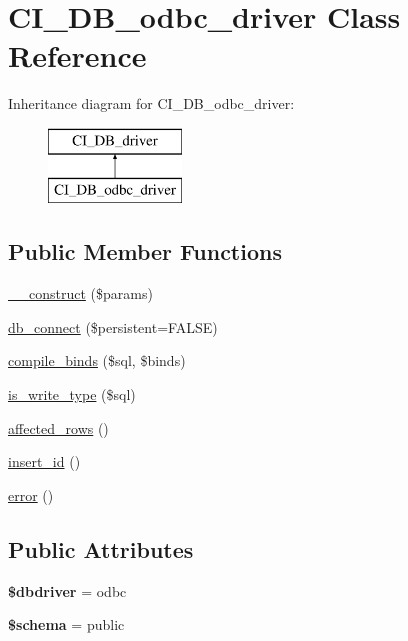 \hypertarget{class_c_i___d_b__odbc__driver}{}\section{C\+I\+\_\+\+D\+B\+\_\+odbc\+\_\+driver Class Reference}
\label{class_c_i___d_b__odbc__driver}
Inheritance diagram for C\+I\+\_\+\+D\+B\+\_\+odbc\+\_\+driver\+:\begin{figure}[H]
\begin{center}
\leavevmode
\includegraphics[height=2.000000cm]{class_c_i___d_b__odbc__driver}
\end{center}
\end{figure}
\subsection*{Public Member Functions}
\begin{DoxyCompactItemize}
\item 
\mbox{\hyperlink{class_c_i___d_b__odbc__driver_a1a5710dfc68a455b9e5c39980e8c5daa}{\+\_\+\+\_\+construct}} (\$params)
\item 
\mbox{\hyperlink{class_c_i___d_b__odbc__driver_aa14bb594952a5e7869ee61633dc27e69}{db\+\_\+connect}} (\$persistent=F\+A\+L\+SE)
\item 
\mbox{\hyperlink{class_c_i___d_b__odbc__driver_ab835fef7e59fe57a52ce68670421d7aa}{compile\+\_\+binds}} (\$sql, \$binds)
\item 
\mbox{\hyperlink{class_c_i___d_b__odbc__driver_a34015edad08eb1922dec8269f4bf87f1}{is\+\_\+write\+\_\+type}} (\$sql)
\item 
\mbox{\hyperlink{class_c_i___d_b__odbc__driver_a7b25b423b57b22ce7715e805e36aa334}{affected\+\_\+rows}} ()
\item 
\mbox{\hyperlink{class_c_i___d_b__odbc__driver_aff1a96e2d3908fc691f202d52fa7e324}{insert\+\_\+id}} ()
\item 
\mbox{\hyperlink{class_c_i___d_b__odbc__driver_a80b31b6166f5a41763f30c377453a656}{error}} ()
\end{DoxyCompactItemize}
\subsection*{Public Attributes}
\begin{DoxyCompactItemize}
\item 
\mbox{\label{class_c_i___d_b__odbc__driver_a8fd71bed0d3540020eabb9a4cb341241}} 
{\bfseries \$dbdriver} = \textquotesingle{}odbc\textquotesingle{}
\item 
\mbox{\label{class_c_i___d_b__odbc__driver_aa607465547992244b58cc628179f47e8}} 
{\bfseries \$schema} = \textquotesingle{}public\textquotesingle{}
\end{DoxyCompactItemize}
